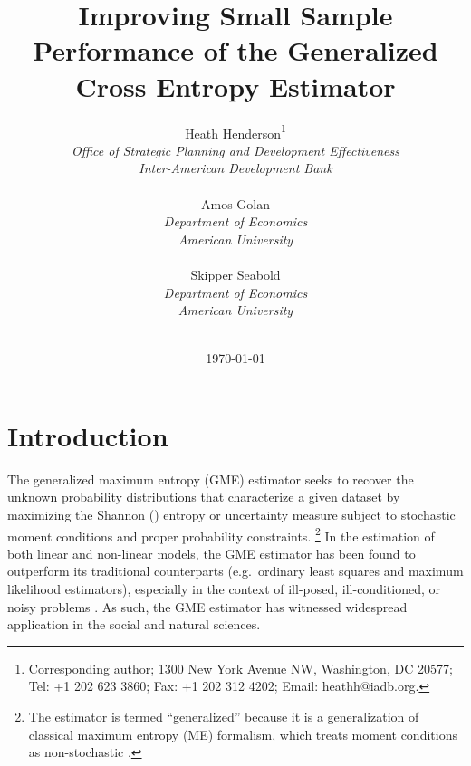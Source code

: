 \documentclass[english]{article}
\title{Improving Small Sample Performance of the Generalized Cross 
Entropy Estimator}
\author{
Heath Henderson\thanks{Corresponding author; 1300 New York Avenue 
NW, Washington, DC 20577; Tel: +1 202 623 3860; Fax: +1 202 312 4202; 
Email: heathh@iadb.org.}\\
\textit{Office of Strategic Planning and Development Effectiveness} \\
\textit{Inter-American Development Bank} \\
\\
Amos Golan \\
\textit{Department of Economics}\\
\textit{American University} \\
\\
Skipper Seabold \\
\textit{Department of Economics}\\
\textit{American University}
\\ \\
}
\date{\today}
\begin{document}

\begin{titlepage}
\maketitle

\thispagestyle{empty}
\end{titlepage}
\newpage


\doublespacing


\section{Introduction}
\label{sec: intro}

The generalized maximum entropy (GME) estimator seeks to recover the 
unknown probability distributions that characterize a given dataset by 
maximizing the Shannon (\citeyear{shannon1948}) entropy or uncertainty 
measure subject to stochastic moment conditions and proper probability 
constraints.%
\footnote{The estimator is termed ``generalized'' because it is a 
generalization of classical maximum entropy (ME) formalism, which treats
moment conditions as non-stochastic \citep{jaynes1957a, jaynes1957b}.}
In the estimation of both linear and non-linear models, the GME estimator
has been found to outperform its traditional counterparts (e.g.\ ordinary 
least squares and maximum likelihood estimators), especially in the context 
of ill-posed, ill-conditioned, or noisy problems \citep{golan1996}.
As such, the GME estimator has witnessed widespread application in the 
social and natural sciences.
\end{document}
